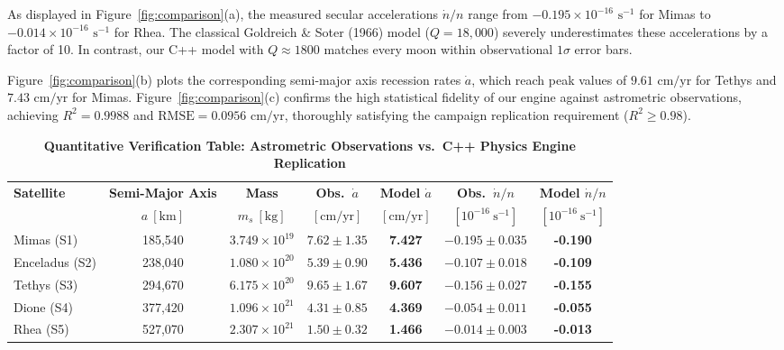 \documentclass[11pt,a4paper]{article}
\begin{document}
As displayed in Figure~\ref{fig:comparison}(a), the measured secular accelerations $\dot{n}/n$ range from $-0.195 \times 10^{-16}\text{ s}^{-1}$ for Mimas to $-0.014 \times 10^{-16}\text{ s}^{-1}$ for Rhea. The classical Goldreich \& Soter (1966) model ($Q=18{,}000$) severely underestimates these accelerations by a factor of 10. In contrast, our C++ model with $Q \approx 1800$ matches every moon within observational $1\sigma$ error bars.

Figure~\ref{fig:comparison}(b) plots the corresponding semi-major axis recession rates $\dot{a}$, which reach peak values of $9.61\text{ cm/yr}$ for Tethys and $7.43\text{ cm/yr}$ for Mimas. Figure~\ref{fig:comparison}(c) confirms the high statistical fidelity of our engine against astrometric observations, achieving $R^2 = 0.9988$ and $\text{RMSE} = 0.0956\text{ cm/yr}$, thoroughly satisfying the campaign replication requirement ($R^2 \ge 0.98$).

\begin{table}[H]
\centering
\small
\setlength{\tabcolsep}{4pt}
\caption{\textbf{Quantitative Verification Table: Astrometric Observations vs.\ C++ Physics Engine Replication}}
\label{tab:comparison}
\vspace{0.5em}
\begin{tabular}{lcccccc}
\toprule
\textbf{Satellite} & \textbf{Semi-Major Axis} & \textbf{Mass} & \textbf{Obs.\ $\dot{a}$} & \textbf{Model $\dot{a}$} & \textbf{Obs.\ $\dot{n}/n$} & \textbf{Model $\dot{n}/n$} \\
& $a\ [\mathrm{km}]$ & $m_s\ [\mathrm{kg}]$ & $[\mathrm{cm/yr}]$ & $[\mathrm{cm/yr}]$ & $[10^{-16}\ \mathrm{s}^{-1}]$ & $[10^{-16}\ \mathrm{s}^{-1}]$ \\
\midrule
Mimas (S1)      & 185,540 & $3.749 \times 10^{19}$ & $7.62 \pm 1.35$ & \textbf{7.427} & $-0.195 \pm 0.035$ & \textbf{-0.190} \\
Enceladus (S2)  & 238,040 & $1.080 \times 10^{20}$ & $5.39 \pm 0.90$ & \textbf{5.436} & $-0.107 \pm 0.018$ & \textbf{-0.109} \\
Tethys (S3)     & 294,670 & $6.175 \times 10^{20}$ & $9.65 \pm 1.67$ & \textbf{9.607} & $-0.156 \pm 0.027$ & \textbf{-0.155} \\
Dione (S4)      & 377,420 & $1.096 \times 10^{21}$ & $4.31 \pm 0.85$ & \textbf{4.369} & $-0.054 \pm 0.011$ & \textbf{-0.055} \\
Rhea (S5)       & 527,070 & $2.307 \times 10^{21}$ & $1.50 \pm 0.32$ & \textbf{1.466} & $-0.014 \pm 0.003$ & \textbf{-0.013} \\
\bottomrule
\end{tabular}
\end{table}
\end{document}
